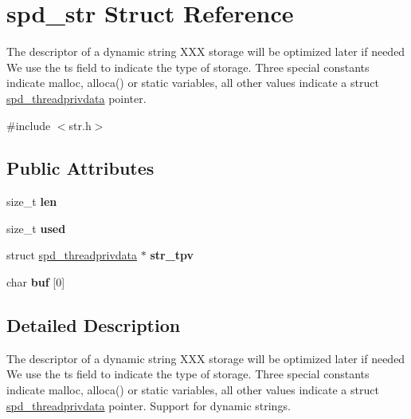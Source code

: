 \hypertarget{structspd__str}{
\section{spd\_\-str Struct Reference}
\label{structspd__str}
}


The descriptor of a dynamic string XXX storage will be optimized later if needed We use the ts field to indicate the type of storage. Three special constants indicate malloc, alloca() or static variables, all other values indicate a struct \hyperlink{structspd__threadprivdata}{spd\_\-threadprivdata} pointer.  




{\ttfamily \#include $<$str.h$>$}

\subsection*{Public Attributes}
\begin{DoxyCompactItemize}
\item 
\hypertarget{structspd__str_aec599616e242e3a8d971db93effe3abe}{
size\_\-t {\bfseries len}}
\label{structspd__str_aec599616e242e3a8d971db93effe3abe}

\item 
\hypertarget{structspd__str_a615f55dbf020b304750c4743b9e2e25e}{
size\_\-t {\bfseries used}}
\label{structspd__str_a615f55dbf020b304750c4743b9e2e25e}

\item 
\hypertarget{structspd__str_a4a2be06020dc7f20d979e3a9075d6ad6}{
struct \hyperlink{structspd__threadprivdata}{spd\_\-threadprivdata} $\ast$ {\bfseries str\_\-tpv}}
\label{structspd__str_a4a2be06020dc7f20d979e3a9075d6ad6}

\item 
\hypertarget{structspd__str_a2bf4db32e80ff5945af3ce8589959764}{
char {\bfseries buf} \mbox{[}0\mbox{]}}
\label{structspd__str_a2bf4db32e80ff5945af3ce8589959764}

\end{DoxyCompactItemize}


\subsection{Detailed Description}
The descriptor of a dynamic string XXX storage will be optimized later if needed We use the ts field to indicate the type of storage. Three special constants indicate malloc, alloca() or static variables, all other values indicate a struct \hyperlink{structspd__threadprivdata}{spd\_\-threadprivdata} pointer. Support for dynamic strings.

